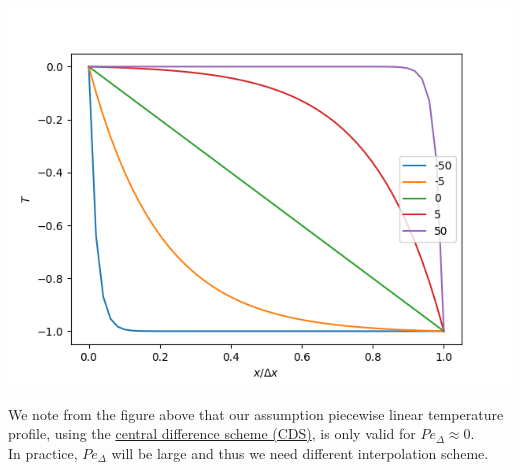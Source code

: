 \documentclass[11pt]{article}
\begin{document}
\begin{center}
\includegraphics[scale=0.8]{pic/pectet_visual_pipe.png}
\end{center}
We note from the figure above that our assumption piecewise linear temperature profile, using
the \uline{central difference scheme (CDS)}, is only valid for \(Pe_\Delta \approx 0\). \\
In practice, \(Pe_\Delta\) will be large and thus we need different interpolation scheme. 
\end{document}
